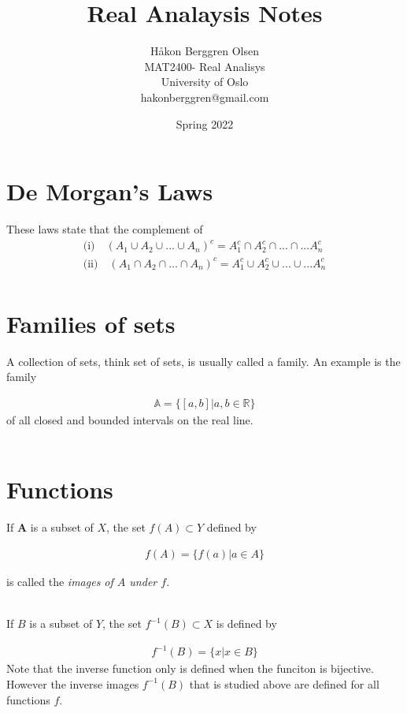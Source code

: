 \documentclass[12pt,letterpaper]{article}
\title{Real Analaysis Notes}
\author{Håkon Berggren Olsen\\
  \small{MAT2400- Real Analisys}\\
  \small{University of Oslo}\\
  \small{hakonberggren@gmail.com}
}
\date{Spring 2022}
\begin{document}
 
\maketitle



\section*{De Morgan's Laws}
These laws state that the complement of 
\begin{align*}
	\text{(i)} \quad  (A_1 \cup A_2 \cup... \cup A_n)^c = A_1^c \cap A_2^c \cap ... \cap...A_n^c \\
	\text{(ii)} \quad  (A_1 \cap A_2 \cap... \cap A_n)^c = A_1^c \cup A_2^c \cup ... \cup...A_n^c \\
\end{align*}

\section*{Families of sets}
A collection of sets, think set of sets, is usually called a family. An example is the family

\begin{align*}
	\mathbb{A} = \{[a,b] | a,b \in \mathbb{R}\}
\end{align*}
of all closed and bounded intervals on the real line. \\


\noindent \\
\section*{Functions}
If $\mathbf{A}$ is a subset of $X$, the set $f(A) \subset Y$ defined by


\begin{align*}
	f(A) = \{ f(a) | a \in A\}
\end{align*}

is called the \textit{images of $A$ under $f$}. 

\noindent \\
If $B$ is a subset of $Y$, the set $f^{-1}(B) \subset X$ is defined by

\begin{align*}
	f^{-1}(B) = \{ x | x \in B\}
\end{align*}
Note that the inverse function only is defined when the funciton is bijective. However the inverse images $f^{-1}(B)$ that is studied above are defined for all functions $f$.
\end{document}
